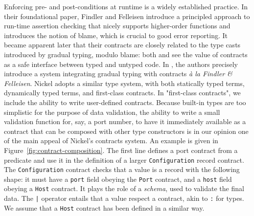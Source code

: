 \documentclass[sigplan,10pt,review,anonymous]{acmart}
\newcommand{\unsure}[2][1=]{}
\newcommand{\resolved}[2]{}
\begin{document}
Enforcing pre- and post-conditions at runtime is a widely established practice.
In their foundational paper\cite{FindlerFelleisenHOContracts}, Findler and
Felleisen introduce a principled approach to run-time assertion checking that
nicely supports higher-order functions and introduces the notion of blame, which
is crucial to good error reporting. It became apparent later that their
contracts are closely related to the type casts introduced by gradual typing,
modulo blame\unsure{What does ``modulo blame'' means here?}: both \cite{FindlerMultiLang} and \cite{FelleisenInterLang} see the
value of contracts as a safe interface between typed and untyped code. In
\cite{WellTypedBlamed}, the authors precisely introduce a system integrating
gradual typing with contracts \textit{à la Findler \& Felleisen}.\unsure{The
historical bit should probably be moved to related works eventually} Nickel
adopts a similar type system, with both statically typed terms, dynamically
typed terms, and first-class contracts. In "first-class contracts", we include
the ability to write user-defined contracts. Because built-in types are too
simplistic for the purpose of data validation, the ability to write a small
validation function for, say, a port number, to have it immediately available as
a contract that can be composed with other type constructors\resolved{Needs code
to illustrate.}, is in our opinion one of the main appeal of Nickel's contracts
system. An example is given in Figure~\ref{fig:contract-composition}. The first
line defines a port contract from a predicate and use it in the definition of a
larger \lstinline+Configuration+ record contract. The \lstinline+Configuration+
contract checks that a value is a record with the following shape: it must have
a \lstinline+port+ field obeying the \lstinline+Port+ contract, and a
\lstinline+host+ field obeying a \lstinline+Host+ contract. It plays the role of
a \emph{schema}, used to validate the final data. The \lstinline+|+ operator
entails that a value respect a contract, akin to \lstinline+:+ for types. We
assume that a \lstinline+Host+ contract has been defined in a similar
way.\unsure{What's missing in this section is an example of how
  contracts differ from standard dynamic type checking on some
  function. Namely, the quality of error messages.}
\end{document}
